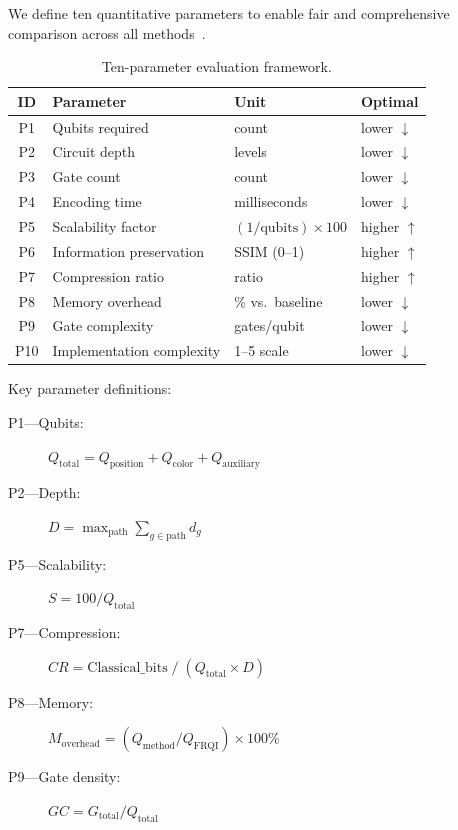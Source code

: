 \documentclass{ipol}
\begin{document}
We define ten quantitative parameters to enable fair and comprehensive
comparison across all methods~\cite{ref45,ref48}.

\begin{table}[H]
\begin{center}
\begin{tabular}{clll}
\hline
ID & Parameter & Unit & Optimal \\
\hline
P1 & Qubits required & count & lower $\downarrow$ \\
P2 & Circuit depth & levels & lower $\downarrow$ \\
P3 & Gate count & count & lower $\downarrow$ \\
P4 & Encoding time & milliseconds & lower $\downarrow$ \\
P5 & Scalability factor & $(1/\text{qubits}) \times 100$ & higher $\uparrow$ \\
P6 & Information preservation & SSIM (0--1) & higher $\uparrow$ \\
P7 & Compression ratio & ratio & higher $\uparrow$ \\
P8 & Memory overhead & \% vs.\ baseline & lower $\downarrow$ \\
P9 & Gate complexity & gates/qubit & lower $\downarrow$ \\
P10 & Implementation complexity & 1--5 scale & lower $\downarrow$ \\
\hline
\end{tabular}
\caption{Ten-parameter evaluation framework.}
\label{tab:ten_parameters}
\end{center}
\end{table}

Key parameter definitions:
\begin{description}
  \item[P1---Qubits:] $Q_{\text{total}} = Q_{\text{position}} + Q_{\text{color}} + Q_{\text{auxiliary}}$
  \item[P2---Depth:] $D = \max_{\text{path}} \sum_{g \in \text{path}} d_g$
  \item[P5---Scalability:] $S = 100 / Q_{\text{total}}$
  \item[P7---Compression:] $CR = \text{Classical\_bits} \;/\; (Q_{\text{total}} \times D)$
  \item[P8---Memory:] $M_{\text{overhead}} = (Q_{\text{method}} / Q_{\text{FRQI}}) \times 100\%$
  \item[P9---Gate density:] $GC = G_{\text{total}} / Q_{\text{total}}$
\end{description}
\end{document}
